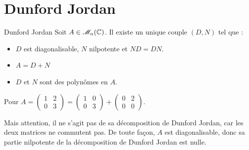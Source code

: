 \section*{Dunford Jordan}

\begin{theoreme}{Dunford Jordan}{}
    Soit $A \in \mathscr M_n(\mathbb{C})$.
    Il existe un unique couple $(D, N)$ tel que :
    \begin{itemize}
        \item $D$ est diagonalisable, $N$ nilpotente et $ND = DN$.
        \item $A = D + N$
        \item $D$ et $N$ sont des polynômes en $A$.
    \end{itemize}
\end{theoreme}

\begin{exemple}
    Pour $A = \begin{pmatrix} 1 & 2 \\ 0 & 3 \end{pmatrix} = \begin{pmatrix} 1 & 0 \\ 0 & 3 \end{pmatrix} + \begin{pmatrix} 0 & 2 \\ 0 & 0 \end{pmatrix}$.
    
    Mais attention, il ne s'agit pas de sa décomposition de Dunford Jordan, car les deux matrices ne commutent pas.
    De toute façon, $A$ est diagonalisable, donc sa partie nilpotente de la décomposition de Dunford Jordan est nulle.
\end{exemple}

